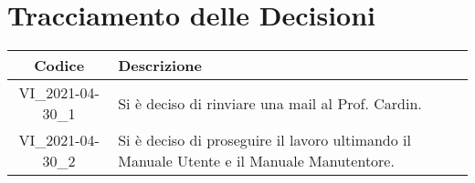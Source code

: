 \section*{Tracciamento delle Decisioni}

\begin{center}
	\begin{longtable}{|c|p{13cm}|}
	\hline
	\rowcolor{lighter-grayer}
	\textbf{Codice} & \textbf{Descrizione} \\
	\hline
	\endfirsthead

	
	
	VI\_2021-04-30\_1 & Si è deciso di rinviare una mail al Prof. Cardin.  \\
	\hline
	VI\_2021-04-30\_2 & Si è deciso di proseguire il lavoro ultimando il Manuale Utente e il Manuale Manutentore.  \\
	\hline
	

	\end{longtable}
\end{center}

